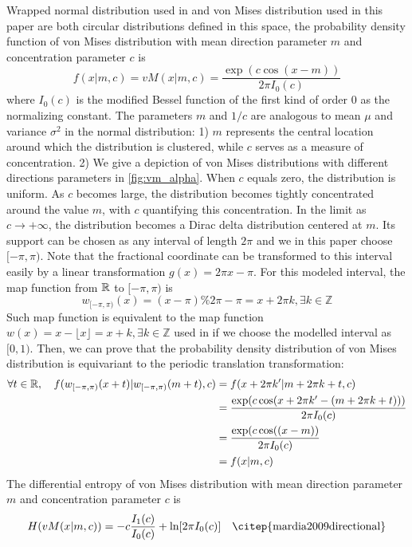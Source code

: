 Wrapped normal distribution used in \citet{jiao2023crystal} and von Mises distribution used in this paper are both circular distributions defined in this space, the probability density function of von Mises distribution with mean direction parameter $m$ and concentration parameter $c$ is 
\begin{equation}
f(x|m,c)=vM(x|m,c)=\frac{\exp(c\cos(x-m))}{2\pi I_0(c)}
\end{equation}
where $I_0(c)$ is the modified Bessel function of the first kind of order 0 as the normalizing constant. The parameters $m$ and $1/c$ are analogous to mean $\mu$ and variance $\sigma^2$ in the normal distribution: 1) $m$ represents the central location around which the distribution is clustered, while $c$ serves as a measure of concentration. 2) We give a depiction of von Mises distributions with different directions parameters in \cref{fig:vm_alpha}. When $c$ equals zero, the distribution is uniform. As $c$ becomes large, the distribution becomes tightly concentrated around the value $m$, with $c$ quantifying this concentration. In the limit as $c\rightarrow+\infty$, the distribution becomes a Dirac delta distribution centered at $m$. Its support can be chosen as any interval of length $2\pi$ and we in this paper choose $[-\pi,\pi)$. Note that the fractional coordinate can be transformed to this interval easily by a linear transformation $g(x)=2\pi x-\pi$. For this modeled interval, the map function from $\mathbb{R}$ to $[-\pi,\pi)$ is 
\begin{equation}
w_{[-\pi,\pi)}(x)=(x-\pi)\%2\pi-\pi=x+2\pi k, \exists k\in \mathbb{Z}
\end{equation}
Such map function is equivalent to the map function $w(x)=x-\lfloor x\rfloor=x+k, \exists k\in \mathbb{Z}$ used in \citet{jiao2023crystal} if we choose the modelled interval as $[0,1)$. Then, we can prove that the probability density distribution of von Mises distribution is equivariant to the periodic translation transformation:
\begin{align}
    \forall t\in \mathbb{R},\quad f(w_{[-\pi,\pi)}(x+t)|w_{[-\pi,\pi)}(m+t),c)&=f(x+2\pi k'|m+2\pi k+t,c)\nonumber\\
    &=\frac{\exp(c\cos(x+2\pi k'-(m+2\pi k+t)))}{2\pi I_0(c)}\nonumber\\
    &=\frac{\exp(c\cos((x-m))}{2\pi I_0(c)}\nonumber\\
    &=f(x|m,c) \label{eq:vm_period_equi}
\end{align}
The differential entropy of von Mises distribution with mean direction parameter $m$ and concentration parameter $c$ is
\begin{equation}\label{eq:vm_entropy}
    H(vM(x|m,c))=-c\frac{I_1(c)}{I_0(c)}+\ln[2\pi I_0(c)]\quad\text{\citep{mardia2009directional}}
\end{equation}

